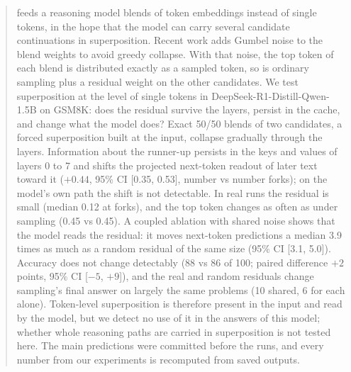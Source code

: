 \begin{abstract}
\ST{} feeds a reasoning model blends of token embeddings instead of single tokens, in the hope that the model can
carry several candidate continuations in superposition.
Recent work adds Gumbel noise to the blend weights to avoid greedy collapse.
With that noise, the top token of each blend is distributed exactly as a sampled token, so \GST{} is ordinary sampling
plus a residual weight on the other candidates.
We test superposition at the level of single tokens in DeepSeek-R1-Distill-Qwen-1.5B on GSM8K: does the residual %
survive the layers, persist in the cache, and change what the model does?
Exact 50/50 blends of two candidates, a forced superposition built at the input,
collapse gradually through the layers.
Information about the runner-up persists in the keys and values of layers 0 to 7 and shifts the projected %
next-token readout of later text toward it ($+0.44$, 95\% CI [0.35, 0.53], number vs number forks); %
on the model's own path the shift is not detectable.
In real runs the residual is small (median 0.12 at forks), and the top token changes as often as under %
sampling (0.45 vs 0.45). %
A coupled ablation with shared noise shows that the model reads the residual: it moves next-token predictions a
median 3.9 times as much as a random residual of the same size (95\% CI [3.1, 5.0]). %
Accuracy does not change detectably (88 vs 86 of 100; paired difference $+2$ points, 95\% CI [$-5$, $+9$]), %
and the real and random residuals change sampling's final answer on largely the same problems %
(10 shared, 6 for each alone). %
Token-level superposition is therefore present in the input and read by the model, but we detect no use of it in
the answers of this model; whether whole reasoning paths are carried in superposition is not tested here.
The main predictions were committed before the runs, and every number from our experiments is recomputed from saved
outputs.
\end{abstract}
